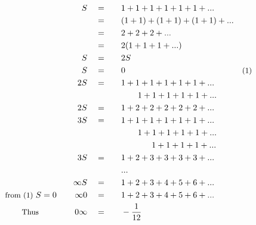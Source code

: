 \begin{alignat*}{5}
&\,&S\quad&=\quad&&1+1+1+1+1+1+...\\
&\,&\,&=&&(1+1)+(1+1)+(1+1)+...\\
&\,&\,&=&&2+2+2+...\\
&\,&\,&=&&2(1+1+1+...)\\
&\,&S\quad&=&&2S\\
&\,&S\quad&=&&0\qquad&\small\text{(1)}\\
&\,&2S\quad&=&&1+1+1+1+1+1+...\\
&\,&\,&\,&&\quad~~~1+1+1+1+1+...\\
&\,&2S\quad&=&&1+2+2+2+2+2+...\\
&\,&3S\quad&=&&1+1+1+1+1+1+...\\
&\,&\,&\,&&\quad~~~1+1+1+1+1+...\\
&\,&\,&\,&&\qquad\quad~~1+1+1+1+...\\
&\,&3S\quad&=&&1+2+3+3+3+3+...\\
&\,&\,&\,&&...\\
&\,&\infty S\quad&=\quad&&1+2+3+4+5+6+...\\
&\small\text{from (1) }S=0\normalsize\quad&\infty0\quad&=&&1+2+3+4+5+6+...\\
&\qquad\small\text{Thus}&0\infty\quad&=&&-\frac{1}{12}
\end{alignat*}
